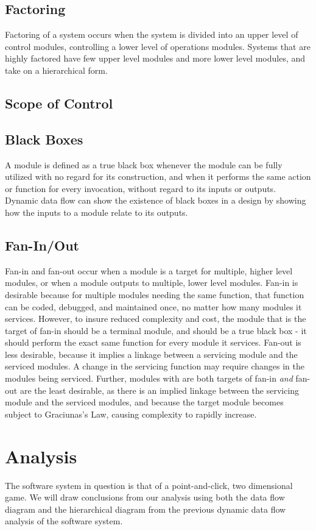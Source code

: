 \documentclass{article}
\begin{document}
	\subsection{Factoring}
		Factoring of a system occurs when the system is divided into an upper level of control modules, controlling a lower level of operations modules. Systems that are highly factored have few upper level modules and more lower level modules, and take on a hierarchical form. 
	\subsection{Scope of Control}
	\subsection{Black Boxes}
		A module is defined as a true black box whenever the module can be fully utilized with no regard for its construction, and when it performs the same action or function for every invocation, without regard to its inputs or outputs. Dynamic data flow can show the existence of black boxes in a design by showing how the inputs to a module relate to its outputs. 
	\subsection{Fan-In/Out}
		Fan-in and fan-out occur when a module is a target for multiple, higher level modules, or when a module outputs to multiple, lower level modules. Fan-in is desirable because for multiple modules needing the same function, that function can be coded, debugged, and maintained once, no matter how many modules it services. However, to insure reduced complexity and cost, the module that is the target of fan-in should be a terminal module, and should be a true black box - it should perform the exact same function for every module it services. Fan-out is less desirable, because it implies a linkage between a servicing module and the serviced modules. A change in the servicing function may require changes in the modules being serviced. Further, modules with are both targets of fan-in \emph{and} fan-out are the least desirable, as there is an implied linkage between the servicing module and the serviced modules, and because the target module becomes subject to Graciunas's Law, causing complexity to rapidly increase. 
\section{Analysis}
	The software system in question is that of a point-and-click, two dimensional game. We will draw conclusions from our analysis using both the data flow diagram and the hierarchical diagram from the previous dynamic data flow analysis of the software system. 
\end{document}
